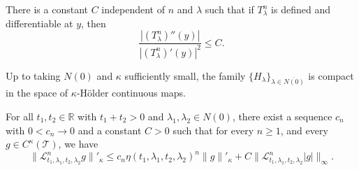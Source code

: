 \documentclass[10pt,a4paper]{amsart}
\begin{document}
\begin{lem}\label{l:L2MS}
There is a constant $C$ independent of $n$ and $\lambda$ such that if $T_\lambda^n$
is defined and differentiable at $y$, then
\[
\frac{|(T^n_\lambda)'' (y)|}{|(T^n_\lambda)' (y)|^2} \leq C.
\]
\end{lem}

\begin{lem}\label{l:Hlambda-logq}
Up to taking $N(0)$ and $\kappa$ sufficiently small, 
the family $\{H_\lambda\}_{\lambda \in\overline{ N(0)}}$
is compact
in the space 
of $\kappa$-H\"older continuous maps.
\end{lem}

\begin{lem}\label{l:L4MS}
For all 
$t_1,t_2 \in \mathbb R$ with $t_1+t_2>0$
and $\lambda_1,\lambda_2\in N(0)$,
there exist a sequence $c_n$ with $0 < c_n\to 0$ 
and a constant $C>0$ such that for
every $n\ge1$, and every $g \in C^{\kappa}(\mathcal T)$, 
we have
$$\|\mathcal L^n_{t_1,\lambda_1, t_2, \lambda_2}
g\|'_{\kappa} \le c_n
\eta(t_1,\lambda_1, t_2, \lambda_2)^n
\|g\|'_{\kappa} +C \|\mathcal L^n_{t_1,\lambda_1, t_2, \lambda_2}|g| \|_{\infty}.$$
\end{lem}
\end{document}
